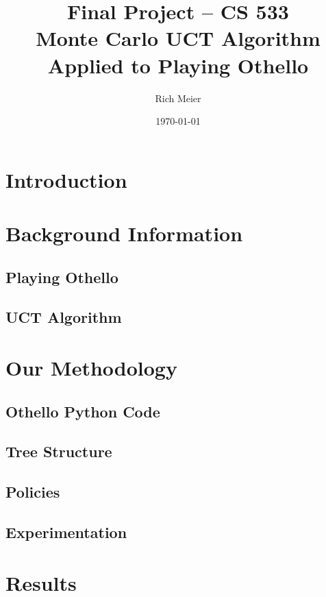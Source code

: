 \documentclass[12pt,letterpaper]{article}
\begin{document}
\title{\vspace{-1in}Final Project -- CS 533 \\ Monte Carlo UCT Algorithm Applied to Playing Othello}
\author{Rich Meier}
\date{\today}
\maketitle

\vspace{-.5in}
\section{Introduction}


\section{Background Information}


\subsection{Playing Othello}

\subsection{UCT Algorithm}



\section{Our Methodology}

\subsection{Othello Python Code}

\subsection{Tree Structure}

\subsection{Policies}

\subsection{Experimentation}


\section{Results}
\end{document}
